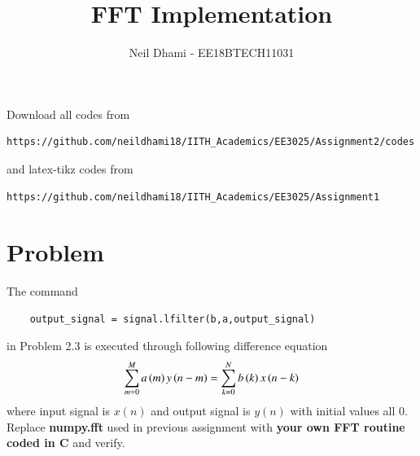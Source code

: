 \documentclass[journal,12pt,twocolumn]{IEEEtran}
\begin{document}
     \def\rightbox#1{\makebox[0in][r]{#1}}
     \def\centbox#1{\makebox[0in]{#1}}
     \def\topbox#1{\raisebox{-\baselineskip}[0in][0in]{#1}}
     \def\midbox#1{\raisebox{-0.5\baselineskip}[0in][0in]{#1}}
\vspace{3cm}
\title{FFT Implementation}
\author{Neil Dhami - EE18BTECH11031}
\maketitle
\newpage
\bigskip
\renewcommand{\thefigure}{\theenumi}
\renewcommand{\thetable}{\theenumi}
Download all codes from 
\begin{lstlisting}
https://github.com/neildhami18/IITH_Academics/EE3025/Assignment2/codes
\end{lstlisting}
%
and latex-tikz codes from 
%
\begin{lstlisting}
https://github.com/neildhami18/IITH_Academics/EE3025/Assignment1
\end{lstlisting}

\section{Problem}

The command
\begin{lstlisting}
    output_signal = signal.lfilter(b,a,output_signal)
\end{lstlisting}
in Problem 2.3 is executed through following difference equation 
    \begin{align}
        \sum _{m=0}^{M}a\left(m\right)y\left(n-m\right)=\sum _{k=0}^{N}b\left(k\right)x\left(n-k\right)
    \end{align}
 where input signal is $x(n)$ and output signal is $y(n)$ with initial values all 0. Replace \textbf{numpy.fft} used in previous assignment with \textbf{your own FFT routine coded in C} and verify.
\end{document}

